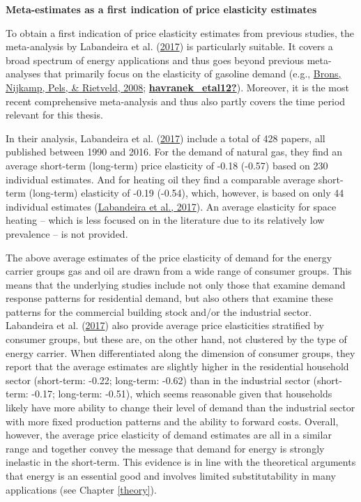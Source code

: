 \documentclass[12pt,twoside]{reedthesis}
\begin{document}
\textbf{Meta-estimates as a first indication of price elasticity estimates}

To obtain a first indication of price elasticity estimates from previous studies, the meta-analysis by Labandeira et al. (\protect\hyperlink{ref-labandeira_etal17}{2017}) is particularly suitable. It covers a broad spectrum of energy applications and thus goes beyond previous meta-analyses that primarily focus on the elasticity of gasoline demand (e.g., \protect\hyperlink{ref-brons_etal08}{Brons, Nijkamp, Pels, \& Rietveld, 2008}; \protect\hyperlink{ref-havranek_etal12}{\textbf{havranek\_etal12?}}). Moreover, it is the most recent comprehensive meta-analysis and thus also partly covers the time period relevant for this thesis.

In their analysis, Labandeira et al. (\protect\hyperlink{ref-labandeira_etal17}{2017}) include a total of 428 papers, all published between 1990 and 2016. For the demand of natural gas, they find an average short-term (long-term) price elasticity of -0.18 (-0.57) based on 230 individual estimates. And for heating oil they find a comparable average short-term (long-term) elasticity of -0.19 (-0.54), which, however, is based on only 44 individual estimates (\protect\hyperlink{ref-labandeira_etal17}{Labandeira et al., 2017}). An average elasticity for space heating -- which is less focused on in the literature due to its relatively low prevalence -- is not provided.

The above average estimates of the price elasticity of demand for the energy carrier groups gas and oil are drawn from a wide range of consumer groups. This means that the underlying studies include not only those that examine demand response patterns for residential demand, but also others that examine these patterns for the commercial building stock and/or the industrial sector. Labandeira et al. (\protect\hyperlink{ref-labandeira_etal17}{2017}) also provide average price elasticities stratified by consumer groups, but these are, on the other hand, not clustered by the type of energy carrier. When differentiated along the dimension of consumer groups, they report that the average estimates are slightly higher in the residential household sector (short-term: -0.22; long-term: -0.62) than in the industrial sector (short-term: -0.17; long-term: -0.51), which seems reasonable given that households likely have more ability to change their level of demand than the industrial sector with more fixed production patterns and the ability to forward costs. Overall, however, the average price elasticity of demand estimates are all in a similar range and together convey the message that demand for energy is strongly inelastic in the short-term. This evidence is in line with the theoretical arguments that energy is an essential good and involves limited substitutability in many applications (see Chapter \ref{theory}).
\end{document}

